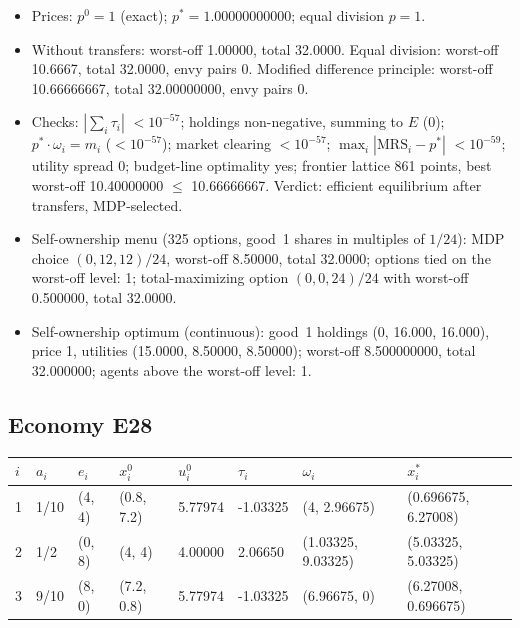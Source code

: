 \begin{itemize}[leftmargin=1.2em,itemsep=0pt,topsep=2pt]\footnotesize
\item Prices: $p^0 = 1$ (exact); $p^* = 1.00000000000$; equal division $p = 1$.
\item Without transfers: worst-off 1.00000, total 32.0000. Equal division: worst-off 10.6667, total 32.0000, envy pairs 0. Modified difference principle: worst-off 10.66666667, total 32.00000000, envy pairs 0.
\item Checks: $|\sum_i\tau_i|$ $<10^{-57}$; holdings non-negative, summing to $E$ (0); $p^*\cdot\omega_i = m_i$ ($<10^{-57}$); market clearing $<10^{-57}$; $\max_i|\mathrm{MRS}_i - p^*|$ $<10^{-59}$; utility spread 0; budget-line optimality yes; frontier lattice 861 points, best worst-off 10.40000000 $\leq$ 10.66666667. Verdict: efficient equilibrium after transfers, MDP-selected.
\item Self-ownership menu (325 options, good~1 shares in multiples of $1/24$): MDP choice $(0, 12, 12)/24$, worst-off 8.50000, total 32.0000; options tied on the worst-off level: 1; total-maximizing option $(0, 0, 24)/24$ with worst-off 0.500000, total 32.0000.
\item Self-ownership optimum (continuous): good~1 holdings (0, 16.000, 16.000), price 1, utilities (15.0000, 8.50000, 8.50000); worst-off 8.500000000, total 32.000000; agents above the worst-off level: 1.
\end{itemize}

\subsection*{Economy E28}
\label{ec:E28}
{\scriptsize\setlength{\tabcolsep}{3pt}
\begin{tabular}{@{}llllllll@{}}
\toprule
$i$ & $a_i$ & $e_i$ & $x^0_i$ & $u^0_i$ & $\tau_i$ & $\omega_i$ & $x^*_i$ \\
\midrule
1 & 1/10 & (4, 4) & (0.8, 7.2) & 5.77974 & -1.03325 & (4, 2.96675) & (0.696675, 6.27008) \\
2 & 1/2 & (0, 8) & (4, 4) & 4.00000 & 2.06650 & (1.03325, 9.03325) & (5.03325, 5.03325) \\
3 & 9/10 & (8, 0) & (7.2, 0.8) & 5.77974 & -1.03325 & (6.96675, 0) & (6.27008, 0.696675) \\
\bottomrule\end{tabular}}

